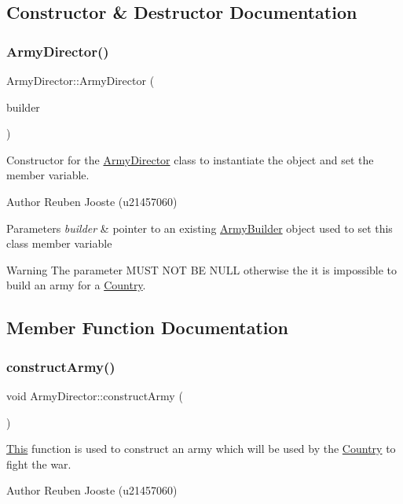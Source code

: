 \subsection{Constructor \& Destructor Documentation}
\mbox{\label{class_army_director_a5d24ebede0923adfbb6dd8b06af3809f}} 
\subsubsection{\texorpdfstring{ArmyDirector()}{ArmyDirector()}}
{\footnotesize\ttfamily Army\+Director\+::\+Army\+Director (\begin{DoxyParamCaption}\item[{\mbox{\hyperlink{class_army_builder}{Army\+Builder}} $\ast$}]{builder }\end{DoxyParamCaption})}



Constructor for the \mbox{\hyperlink{class_army_director}{Army\+Director}} class to instantiate the object and set the member variable. 

\begin{DoxyAuthor}{Author}
Reuben Jooste (u21457060) 
\end{DoxyAuthor}

\begin{DoxyParams}{Parameters}
{\em builder} & pointer to an existing \mbox{\hyperlink{class_army_builder}{Army\+Builder}} object used to set this class\textquotesingle{} member variable \\
\hline
\end{DoxyParams}
\begin{DoxyWarning}{Warning}
The parameter M\+U\+ST N\+OT BE N\+U\+LL otherwise the it is impossible to build an army for a \mbox{\hyperlink{class_country}{Country}}. 
\end{DoxyWarning}


\subsection{Member Function Documentation}
\mbox{\label{class_army_director_a18fcc0cd2f4122ed600388f12efe92b9}} 
\subsubsection{\texorpdfstring{constructArmy()}{constructArmy()}}
{\footnotesize\ttfamily void Army\+Director\+::construct\+Army (\begin{DoxyParamCaption}{ }\end{DoxyParamCaption})}



\mbox{\hyperlink{class_this}{This}} function is used to construct an army which will be used by the \mbox{\hyperlink{class_country}{Country}} to fight the war. 

\begin{DoxyAuthor}{Author}
Reuben Jooste (u21457060) 
\end{DoxyAuthor}
